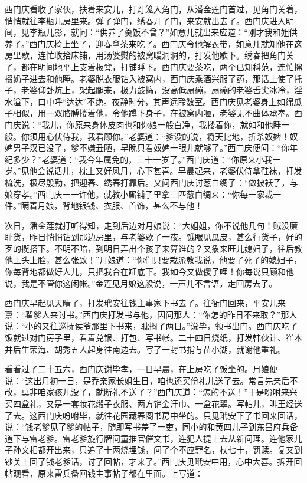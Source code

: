 西门庆看收了家伙，扶着来安儿，打灯笼入角门，从潘金莲门首过，见角门关着，悄悄就往李瓶儿房里来。弹了弹门，绣春开了门，来安就出去了。西门庆进入明间，见李瓶儿影，就问：“供养了羹饭不曾？”如意儿就出来应道：“刚才我和姐供养了。”西门庆椅上坐了，迎春拿茶来吃了。西门庆令他解衣带，如意儿就知他在这房里歇，连忙收拾床铺，用汤婆熨的被窝暖洞洞的，打发他歇下。绣春把角门关了，都在明间地平上支着板凳，打铺睡下。西门庆要茶吃，两个已知科范，连忙撺掇奶子进去和他睡。老婆脱衣服钻入被窝内，西门庆乘酒兴服了药，那话上使了托子，老婆仰卧炕上，架起腿来，极力鼓捣，没高低扇磞，扇磞的老婆舌尖冰冷，淫水溢下，口中呼“达达”不绝。夜静时分，其声远聆数室。西门庆见老婆身上如绵瓜子相似，用一双胳膊搂着他，令他蹲下身子，在被窝内咂，老婆无不曲体承奉。西门庆说：“我儿，你原来身体皮肉也和你娘一般白净，我搂着你，就如和他睡一般。你须用心伏侍我，我看顾你。”老婆道：“爹没的说，将天比地，折杀奴婢！奴婢男子汉已没了，爹不嫌丑陋，早晚只看奴婢一眼儿就够了。”西门庆便问：“你年纪多少？”老婆道：“我今年属免的，三十一岁了。”西门庆道：“你原来小我一岁。”见他会说话儿，枕上又好风月，心下甚喜。早晨起来，老婆伏侍拿鞋袜，打发梳洗，极尽殷勤，把迎春、绣春打靠后。又问西门庆讨葱白绸子：“做披袄子，与娘穿孝。”西门庆一一许他。就教小厮铺子里拿三匹葱白绸来：“你每一家裁一件。”瞒着月娘，背地银钱、衣服、首饰，甚么不与他！

次日，潘金莲就打听得知，走到后边对月娘说：“大姐姐，你不说他几句！贼没廉耻货，昨日悄悄钻到那边房里，与老婆歇了一夜。饿眼见瓜皮，甚么行货子，好的歹的揽搭下。不明不暗，到明日弄出个孩子来算谁的？又象来旺儿媳妇子，往后教他上头上脸，甚么张致！”月娘道：“你们只要栽派教我说，他要了死了的媳妇子，你每背地都做好人儿，只把我合在缸底下。我如今又做傻子哩！你每说只顾和他说，我是不管你这闲帐。”金莲见月娘这般说，一声儿不言语，走回房去了。

西门庆早起见天晴了，打发玳安往钱主事家下书去了。往衙门回来，平安儿来禀：“翟爹人来讨书。”西门庆打发书与他，因问那人：“你怎的昨日不来取？”那人说：“小的又往巡抚侯爷那里下书来，耽搁了两日。”说毕，领书出门。西门庆吃了饭就过对门房子里，看着兑银、打包、写书帐。二十四日烧纸，打发韩伙计、崔本并后生荣海、胡秀五人起身往南边去。写了一封书捎与苗小湖，就谢他重礼。

看看过了二十五六，西门庆谢毕孝，一日早晨，在上房吃了饭坐的。月娘便说：“这出月初一日，是乔亲家长姐生日，咱也还买份礼儿送了去。常言先亲后不改，莫非咱家孩儿没了，就断礼不送了？”西门庆道：“怎的不送！”于是吩咐来兴买四盒礼，又是一套妆花缎子衣服、两方销金汗巾、一盒花翠。写帖儿，叫王经送了去。这西门庆吩咐毕，就往花园藏春阁书房中坐的。只见玳安下了书回来回话，说：“钱老爹见了爹的帖子，随即写书差了一吏，同小的和黄四儿子到东昌府兵备道下与雷老爹。雷老爹旋行牌问童推官催文书，连犯人提上去从新问理。连他家儿子孙文相都开出来，只追了十两烧埋钱，问了个不应罪名，杖七十，罚赎。复又到钞关上回了钱老爹话，讨了回帖，才来了。”西门庆见玳安中用，心中大喜。拆开回帖观看，原来雷兵备回钱主事帖子都在里面。上写道：

